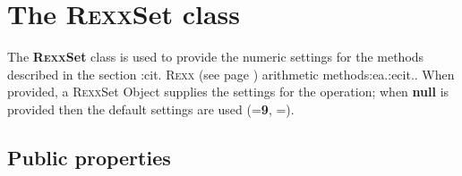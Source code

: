 \section{The R\textsc{exx}Set class}\label{refnlrset}
 
The \textbf{R\textsc{exx}Set} class is used to provide the numeric settings for
the methods described in the section :cit. R\textsc{exx} (see page \pageref{refrexxops}) 
arithmetic methods:ea.:ecit..
When provided, a R\textsc{exx}Set Object supplies the  settings
for the operation; when \textbf{null} is provided then the default
settings are used (=\textbf{9},
=).
\subsection{Public properties}\label{publicproperties}
 
